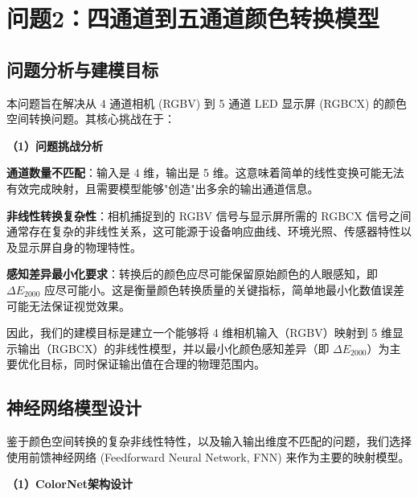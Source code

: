\section[\hspace{-2pt}问题2：四通道到五通道颜色转换模型]{{\heiti{} \hspace{-8pt}问题2：四通道到五通道颜色转换模型}}\label{section3: 问题2：四通道到五通道颜色转换模型}

\subsection[\hspace{-2pt}问题分析与建模目标]{{\heiti{} \hspace{-8pt}问题分析与建模目标}}\label{section2: 问题分析与建模目标}

本问题旨在解决从 4 通道相机 (RGBV) 到 5 通道 LED 显示屏 (RGBCX) 的颜色空间转换问题。其核心挑战在于：

\noindent\textbf{（1）问题挑战分析}

 \textbf{通道数量不匹配}：输入是 4 维，输出是 5 维。这意味着简单的线性变换可能无法有效完成映射，且需要模型能够"创造"出多余的输出通道信息。

 \textbf{非线性转换复杂性}：相机捕捉到的 RGBV 信号与显示屏所需的 RGBCX 信号之间通常存在复杂的非线性关系，这可能源于设备响应曲线、环境光照、传感器特性以及显示屏自身的物理特性。

 \textbf{感知差异最小化要求}：转换后的颜色应尽可能保留原始颜色的人眼感知，即 $\Delta E_{2000}$ 应尽可能小。这是衡量颜色转换质量的关键指标，简单地最小化数值误差可能无法保证视觉效果。

因此，我们的建模目标是建立一个能够将 4 维相机输入（RGBV）映射到 5 维显示输出（RGBCX）的非线性模型，并以最小化颜色感知差异（即 $\Delta E_{2000}$）为主要优化目标，同时保证输出值在合理的物理范围内。

\subsection[\hspace{-2pt}神经网络模型设计]{{\heiti{} \hspace{-8pt}神经网络模型设计}}\label{section2: 神经网络模型设计}

鉴于颜色空间转换的复杂非线性特性，以及输入输出维度不匹配的问题，我们选择使用前馈神经网络 (Feedforward Neural Network, FNN) 来作为主要的映射模型。

\noindent\textbf{（1）ColorNet架构设计}

